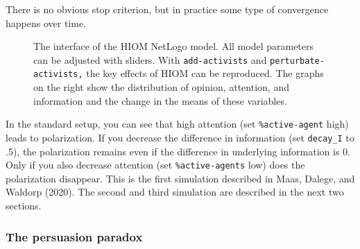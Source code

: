 \documentclass[
  a4paper,
  DIV=11,
  numbers=noendperiod,
  oneside]{scrreprt}
\begin{document}
There is no obvious stop criterion, but in practice some type of
convergence happens over time.

\begin{figure}


\caption{\label{fig-ch7-img10-old-98}The interface of the HIOM NetLogo
model. All model parameters can be adjusted with sliders. With
\texttt{add-activists} and \texttt{perturbate-activists,} the key
effects of HIOM can be reproduced. The graphs on the right show the
distribution of opinion, attention, and information and the change in
the means of these variables.}

\end{figure}%

In the standard setup, you can see that high attention (set
\texttt{\%active-agent} high) leads to polarization. If you decrease the
difference in information (set \texttt{decay\_I} to .5), the
polarization remains even if the difference in underlying information is
0. Only if you also decrease attention (set \texttt{\%active-agents}
low) does the polarization disappear. This is the first simulation
described in Maas, Dalege, and Waldorp (2020). The second and third
simulation are described in the next two sections.

\subsubsection{The persuasion paradox}\label{sec-The-persuasion-paradox}
\end{document}
